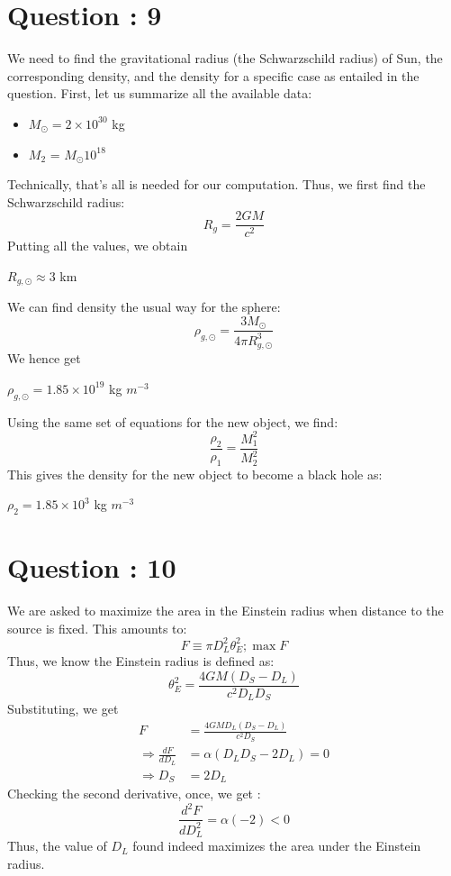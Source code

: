 \documentclass{article}
\begin{document}
\section{Question : 9}
We need to find the gravitational radius (the Schwarzschild radius) of Sun, the corresponding density, and the density for a specific case as entailed in the question. First, let us summarize all the available data:
\begin{itemize}
\item $M_\odot = 2\times 10^{30}$ kg
\item $M_2$ = $M_\odot 10^{18}$ 
\end{itemize}
Technically, that's all is needed for our computation. Thus, we first find the Schwarzschild radius:
\begin{equation}
R_g = \frac{2GM}{c^2}
\end{equation}
Putting all the values, we obtain 
\begin{center}
$R_{g,\odot}\approx3$ km
\end{center}
We can find density the usual way for the sphere:
\begin{equation}
\rho_{g,\odot} = \frac{3M_\odot}{4\pi R_{g,\odot}^3}
\end{equation}
We hence get 
\begin{center}
$\rho_{g,\odot} = 1.85\times 10^{19}$ kg $m^{-3}$
\end{center}
Using the same set of equations for the new object, we find:
\begin{equation}
\frac{\rho_2}{\rho_1} = \frac{M_1^2}{M_2^2}
\end{equation}
This gives the density for the new object to become a black hole as:
\begin{center}
$\rho_2 = 1.85\times10^{3}$ kg $m^{-3}$
\end{center}
\section{Question : 10}
We are asked to maximize the area in the Einstein radius when distance to the source is fixed. This amounts to:
\begin{equation}
F \equiv \pi D_L^2 \theta_E^2; \max F
\end{equation}
Thus, we know the Einstein radius is defined as:
\begin{equation}
\theta_E^2 = \frac{4GM(D_S-D_L)}{c^2D_L D_S}
\label{eqn10:1}
\end{equation}
Substituting, we get
\begin{equation}
\begin{split}
F &= \frac{4GMD_L(D_S-D_L)}{c^2D_S} \\
\Rightarrow \frac{dF}{dD_L} &= \alpha (D_LD_S - 2D_L) = 0 \\
\Rightarrow D_S &= 2D_L 
\end{split}
\end{equation}
Checking the second derivative, once, we get :
\begin{equation}
\frac{d^2F}{dD_L^2} = \alpha (-2) < 0 
\end{equation}
Thus, the value of $D_L$ found indeed maximizes the area under the Einstein radius.
\end{document}
